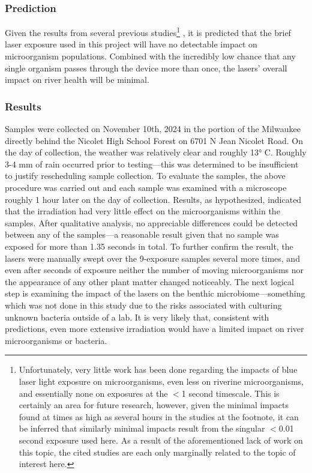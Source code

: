 \documentclass[fleqn,10pt]{SelfArx} %
\begin{document}
	\subsubsection{Prediction}
	Given the results from several previous studies\footnote{Unfortunately, very little work has been done regarding the impacts of blue laser light exposure on microorganisms, even less on riverine microorganisms, and essentially none on exposures at the $<$1 second timescale. This is certainly an area for future research, however, given the minimal impacts found at times as high as several hours in the studies at the footnote, it can be inferred that similarly minimal impacts result from the singular $<$0.01 second exposure used here. As a result of the aforementioned lack of work on this topic, the cited studies are each only marginally related to the topic of interest here. } \cite{Dai_Gupta_Murray_Vrahas_Tegos_Hamblin_2012} \cite{lightExposure} \cite{Gorai_Katayama_Obata_Murata_Taguchi_2014} \cite{lightExposure2},  it is predicted that the brief laser exposure used in this project will have no detectable impact on microorganism populations. Combined with the incredibly low chance that any single organism passes through the device more than once, the lasers' overall impact on river health will be minimal.
	\subsubsection{Results}
		Samples were collected on November 10th, 2024 in the portion of the Milwaukee directly behind the Nicolet High School Forest on 6701 N Jean Nicolet Road. On the day of collection, the weather was relatively clear and roughly 13° C. Roughly 3-4 mm of rain occurred prior to testing—this was determined to be insufficient to justify rescheduling sample collection. To evaluate the samples, the above procedure was carried out and each sample was examined with a microscope roughly 1 hour later on the day of collection. 
	Results, as hypothesized, indicated that the irradiation had very little effect on the microorganisms within the samples. After qualitative analysis, no appreciable differences could be detected between any of the samples—a reasonable result given that no sample was exposed for more than 1.35 seconds in total. To further confirm the result, the lasers were manually swept over the 9-exposure samples several more times, and even after seconds of exposure neither the number of moving microorganisms nor the appearance of any other plant matter changed noticeably. 
	The next logical step is examining the impact of the lasers on the benthic microbiome—something which was not done in this study due to the risks associated with culturing unknown bacteria outside of a lab. It is very likely that, consistent with predictions, even more extensive irradiation would have a limited impact on river microorganisms or bacteria. 
	
\end{document}
